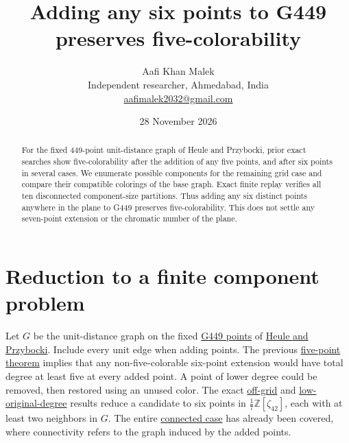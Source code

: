 \documentclass[11pt,letterpaper]{article}
\title{Adding any six points to G449 preserves five-colorability}
\author{Aafi Khan Malek\\ \small Independent researcher, Ahmedabad, India\\
\small\href{mailto:aafimalek2032@gmail.com}{aafimalek2032@gmail.com}}
\date{28 November 2026}
\begin{document}
\maketitle
\begin{abstract}
For the fixed 449-point unit-distance graph of Heule and
Przybocki, prior exact searches show five-colorability after the
addition of any five points, and after six points in several
cases. We enumerate possible components for the remaining grid
case and compare their compatible colorings of the base graph.
Exact finite replay verifies all ten disconnected component-size
partitions. Thus adding any six distinct points anywhere in the plane
to G449 preserves five-colorability. This does not settle any
seven-point extension or the chromatic number of the plane.
\end{abstract}

\section{Reduction to a finite component problem}
Let \(G\) be the unit-distance graph on the fixed
\href{https://github.com/bprzybocki/G449/tree/125bfda97ed1d336f84694de04dedcfb349c5164}{G449 points}
of \href{https://arxiv.org/abs/2611.28518}{Heule and Przybocki}.
Include every unit edge when adding points. The previous
\href{https://github.com/Aafimalek/novel-discoveries/tree/234e0ce194fdfa544d4b551ccea9898b2239dc69/hadwiger-nelson/verification/g449/prime-seven-catalogue/five-point-extensions}{five-point theorem}
implies that any non-five-colorable six-point extension would
have total degree at least five at every added point. A point
of lower degree could be removed, then restored using an unused
color. The exact
\href{https://github.com/Aafimalek/novel-discoveries/tree/6376de4361b98f605326dd6275fa5f9e8b5dd3fb/hadwiger-nelson/verification/g449/prime-seven-catalogue/six-off-grid-extensions}{off-grid}
and
\href{https://github.com/Aafimalek/novel-discoveries/tree/f7be4c235d3d6bc073058db7fb201663ed7955e7/hadwiger-nelson/verification/g449/prime-seven-catalogue/six-grid-one-nonuniversal}{low-original-degree}
results reduce a candidate to six points in
\(\tfrac17\mathbb Z[\zeta_{42}]\), each with at least two
neighbors in \(G\). The entire
\href{https://github.com/Aafimalek/novel-discoveries/tree/018eda729500e0bbafca0557172bd6b0afe0b337/hadwiger-nelson/verification/g449/prime-seven-catalogue/six-grid-connected}{connected case}
has already been covered, where connectivity refers to the
graph induced by the added points.
\end{document}
